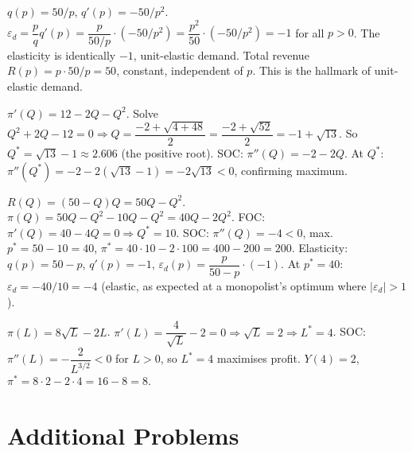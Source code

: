 \begin{solutions}
  \item $q(p)=50/p$, $q'(p)=-50/p^2$.
        $\varepsilon_d=\dfrac{p}{q}q'(p)=\dfrac{p}{50/p}\cdot(-50/p^2)
        =\dfrac{p^2}{50}\cdot(-50/p^2)=-1$ for all $p>0$. The elasticity
        is identically $-1$, unit-elastic demand. Total revenue
        $R(p)=p\cdot50/p=50$, constant, independent of $p$. This is the
        hallmark of unit-elastic demand.

  \item $\pi'(Q)=12-2Q-Q^2$. Solve $Q^2+2Q-12=0\Rightarrow
        Q=\dfrac{-2+\sqrt{4+48}}{2}=\dfrac{-2+\sqrt{52}}{2}
        =-1+\sqrt{13}$. So $Q^*=\sqrt{13}-1\approx2.606$ (the positive
        root). SOC: $\pi''(Q)=-2-2Q$. At $Q^*$:
        $\pi''(Q^*)=-2-2(\sqrt{13}-1)=-2\sqrt{13}<0$, confirming maximum.

  \item $R(Q)=(50-Q)Q=50Q-Q^2$. $\pi(Q)=50Q-Q^2-10Q-Q^2=40Q-2Q^2$. FOC:
        $\pi'(Q)=40-4Q=0\Rightarrow Q^*=10$. SOC: $\pi''(Q)=-4<0$, max.
        $p^*=50-10=40$, $\pi^*=40\cdot10-2\cdot100=400-200=200$.
        Elasticity: $q(p)=50-p$, $q'(p)=-1$,
        $\varepsilon_d(p)=\dfrac{p}{50-p}\cdot(-1)$. At $p^*=40$:
        $\varepsilon_d=-40/10=-4$ (elastic, as expected at a monopolist's
        optimum where $|\varepsilon_d|>1$).

  \item $\pi(L)=8\sqrt{L}-2L$.
        $\pi'(L)=\dfrac{4}{\sqrt{L}}-2=0\Rightarrow\sqrt{L}=2\Rightarrow
        L^*=4$. SOC: $\pi''(L)=-\dfrac{2}{L^{3/2}}<0$ for $L>0$, so
        $L^*=4$ maximises profit. $Y(4)=2$,
        $\pi^*=8\cdot2-2\cdot4=16-8=8$.
\end{solutions}

\section{Additional Problems}

